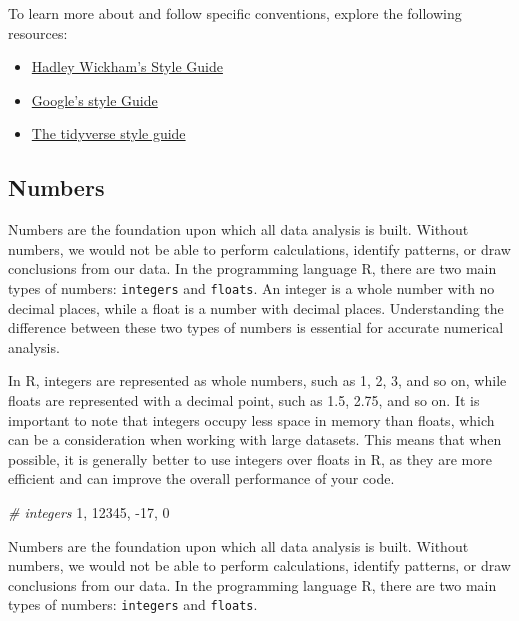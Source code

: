 \documentclass[
]{book}
\newenvironment{Shaded}{\begin{snugshade}}{\end{snugshade}}
\newcommand{\CommentTok}[1]{\textcolor[rgb]{0.56,0.35,0.01}{\textit{#1}}}
\newcommand{\DecValTok}[1]{\textcolor[rgb]{0.00,0.00,0.81}{#1}}
\newcommand{\NormalTok}[1]{#1}
\newcommand{\SpecialCharTok}[1]{\textcolor[rgb]{0.00,0.00,0.00}{#1}}
\begin{document}
To learn more about and follow specific conventions, explore the following resources:

\begin{itemize}
\item
  \href{http://adv-r.had.co.nz/Style.html}{Hadley Wickham's Style Guide}
\item
  \href{https://google.github.io/styleguide/Rguide.html}{Google's style Guide}
\item
  \href{https://style.tidyverse.org/}{The tidyverse style guide}
\end{itemize}

\hypertarget{numbers}{%
\subsection{Numbers}\label{numbers}}

Numbers are the foundation upon which all data analysis is built. Without numbers, we would not be able to perform calculations, identify patterns, or draw conclusions from our data. In the programming language R, there are two main types of numbers: \texttt{integers} and \texttt{floats}. An integer is a whole number with no decimal places, while a float is a number with decimal places. Understanding the difference between these two types of numbers is essential for accurate numerical analysis.

In R, integers are represented as whole numbers, such as 1, 2, 3, and so on, while floats are represented with a decimal point, such as 1.5, 2.75, and so on. It is important to note that integers occupy less space in memory than floats, which can be a consideration when working with large datasets. This means that when possible, it is generally better to use integers over floats in R, as they are more efficient and can improve the overall performance of your code.

\begin{Shaded}
\begin{Highlighting}[]
\CommentTok{\# integers}
\DecValTok{1}\NormalTok{,  }\DecValTok{12345}\NormalTok{, }\SpecialCharTok{{-}}\DecValTok{17}\NormalTok{, }\DecValTok{0}
\end{Highlighting}
\end{Shaded}

Numbers are the foundation upon which all data analysis is built. Without numbers, we would not be able to perform calculations, identify patterns, or draw conclusions from our data. In the programming language R, there are two main types of numbers: \texttt{integers} and \texttt{floats}.
\end{document}

